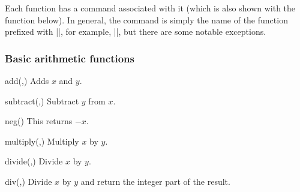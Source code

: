 Each function has a \pgfname{} command associated with it (which is also shown
with the function below). In general, the command is simply the name of the
function prefixed with |\pgfmath|, for example, |\pgfmathadd|, but there are
some notable exceptions.


\subsubsection{Basic arithmetic functions}
\label{pgfmath-functions-basic}

\begin{math-function}{add(,)}
\mathcommand
    Adds $x$ and $y$.
\begin{codeexample}[]
 \pgfmathresult
\end{codeexample}
\end{math-function}

\begin{math-function}{subtract(,)}
\mathcommand
    Subtract $y$ from $x$.
\begin{codeexample}[]
 \pgfmathresult
\end{codeexample}
\end{math-function}

\begin{math-function}{neg()}
\mathcommand
    This returns $-x$.
\begin{codeexample}[]
 \pgfmathresult
\end{codeexample}
\end{math-function}

\begin{math-function}{multiply(,)}
\mathcommand
    Multiply $x$ by $y$.
\begin{codeexample}[]
 \pgfmathresult
\end{codeexample}
\end{math-function}

\begin{math-function}{divide(,)}
\mathcommand
    Divide $x$ by $y$.
\begin{codeexample}[]
 \pgfmathresult
\end{codeexample}
\end{math-function}

\begin{math-function}{div(,)}
\mathcommand
    Divide $x$ by $y$ and return the integer part of the result.
\begin{codeexample}[]
 \pgfmathresult
\end{codeexample}
\end{math-function}

